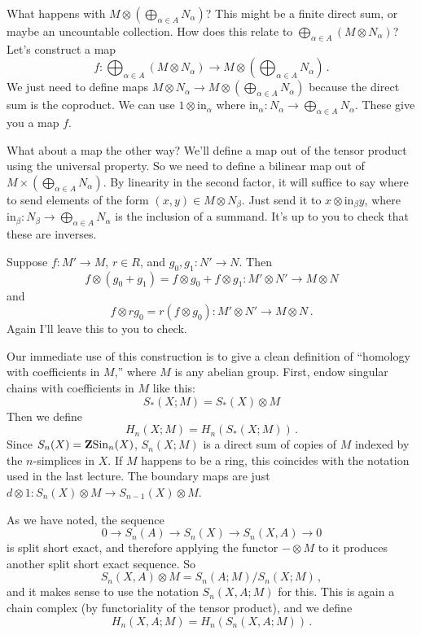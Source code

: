 \begin{property}[Sums]
What happens with $M\otimes\left(\bigoplus_{\alpha\in A}N_\alpha\right)$? This might be a finite direct sum, or maybe an uncountable collection. How does this relate to $\bigoplus_{\alpha\in A}(M\otimes N_\alpha)$? Let's construct a map 
\[
f:\bigoplus_{\alpha\in A}\left(M\otimes N_\alpha\right)\to 
M\otimes\left(\bigoplus_{\alpha\in A}N_\alpha\right)\,.
\]
We just need to define maps $M\otimes N_\alpha\to M\otimes\left(\bigoplus_{\alpha\in A}N_\alpha\right)$ because the direct sum is the coproduct. We can use $1\otimes\text{in}_\alpha$ where $\mathrm{in}_\alpha:N_\alpha\to \bigoplus_{\alpha\in A}N_\alpha$. These give you a map $f$. 

What about a map the other way? We'll define a map out of the tensor product
using the universal property. So we need to define a bilinear map out of
$M\times\left(\bigoplus_{\alpha\in A}N_\alpha\right)$. By linearity in the
second factor, it will suffice to say where to send elements of the form
$(x,y)\in M\otimes N_\beta$. Just send it to $x\otimes\mathrm{in}_\beta y$, 
where $\mathrm{in}_\beta:N_\beta\to \bigoplus_{\alpha\in A}N_\alpha$ 
is the inclusion of a summand. 
It's up to you to check that these are inverses.
\end{property}

\begin{property}[Distributivity] 
Suppose $f:M'\to M$, $r\in R$, and $g_0,g_1:N'\to N$. Then
\[
f\otimes(g_0+g_1)=f\otimes g_0+f\otimes g_1:M'\otimes N'\to M\otimes N
\]
and
\[
f\otimes rg_0=r(f\otimes g_0):M'\otimes N'\to M\otimes N\,.
\]
Again I'll leave this to you to check. 
\end{property}

Our immediate use of this construction is to give a clean definition of 
``homology with coefficients in $M$,'' where $M$ is any abelian group. 
First, endow singular chains with coefficients in $M$ like this:
\[
S_\ast(X;M)=S_\ast(X)\otimes M
\]
Then we define
\[
H_n(X;M)=H_n(S_\ast(X;M))\,.
\]
Since $S_n(X)=\mathbf Z\mathrm{Sin}_n(X)$, $S_n(X;M)$ is a direct sum of copies of $M$
indexed by the $n$-simplices in $X$. If $M$ happens to be a ring, this coincides 
with the notation used in the last lecture. The boundary maps are just 
$d\otimes 1:S_n(X)\otimes M\to S_{n-1}(X)\otimes M$.

As we have noted, the sequence 
\[
0\to S_n(A)\to S_n(X)\to S_n(X,A)\to0
\]
is split short exact, and therefore applying the functor $-\otimes M$ 
to it produces another split short exact sequence. So 
\[
S_n(X,A)\otimes M=S_n(A;M)/S_n(X;M)\,,
\]
and it makes sense to use the notation $S_n(X,A;M)$ for this. This is
again a chain complex (by functoriality of the tensor product), and we define
\[
H_n(X,A;M)=H_n(S_n(X,A;M))\,.
\]

